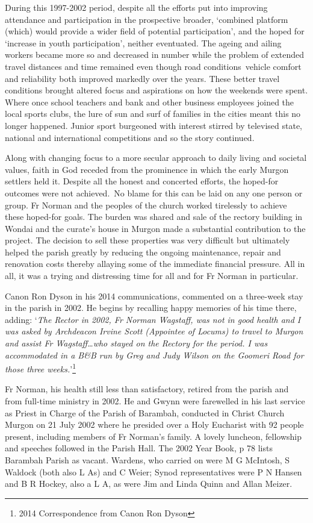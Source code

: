 During this 1997-2002 period, despite all the efforts put into improving attendance and participation in the prospective broader, `combined platform (which) would provide a wider field of potential participation', and the hoped for `increase in youth participation', neither eventuated. The ageing and ailing workers became more so and decreased in number while the problem of extended travel distances and time remained even though road conditions~vehicle comfort and reliability both improved markedly over the years. These better travel conditions brought altered focus and aspirations on how the weekends were spent. Where once school teachers and bank and other business employees joined the local sports clubs, the lure of sun and surf of families in the cities meant this no longer happened. Junior sport burgeoned with interest stirred by televised state, national and international competitions and so the story continued.

Along with changing focus to a more secular approach to daily living and societal values, faith in God receded from the prominence in which the early Murgon settlers held it. Despite all the honest and concerted efforts, the hoped-for outcomes were not achieved.~No blame for this can be laid on any one person or group. Fr Norman and the peoples of the church worked tirelessly to achieve these hoped-for goals. The burden was shared and sale of the rectory building in Wondai and the curate's house in Murgon made a substantial contribution to the project. The decision to sell these properties was very difficult but ultimately helped the parish greatly by reducing the ongoing maintenance, repair and renovation costs thereby allaying some of the immediate financial pressure. All in all, it was a trying and distressing time for all and for Fr Norman in particular.

Canon Ron Dyson in his 2014 communications, commented on a three-week stay in the parish in 2002. He begins by recalling happy memories of his time there, adding: `\emph{The Rector in 2002, Fr Norman Wagstaff, was not in good health and I was asked by Archdeacon Irvine Scott (Appointee of Locums) to travel to Murgon and assist Fr Wagstaff\ldots who stayed on the Rectory for the period. I was accommodated in a B\&B run by Greg and Judy Wilson on the Goomeri Road for those three weeks.}'\footnote{2014 Correspondence from Canon Ron Dyson}

Fr Norman, his health still less than satisfactory, retired from the parish and from full-time ministry in 2002. He and Gwynn were farewelled in his last service as Priest in Charge of the Parish of Barambah, conducted in Christ Church Murgon on 21 July 2002 where he presided over a Holy Eucharist with 92 people present, including members of Fr Norman's family. A lovely luncheon, fellowship and speeches followed in the Parish Hall. The 2002 Year Book, p 78 lists Barambah Parish as vacant. Wardens, who carried on were M G McIntosh, S Waldock (both also L As) and C Weier; Synod representatives were P N Hansen and B R Hockey, also a L A, as were Jim and Linda Quinn and Allan Meizer.

